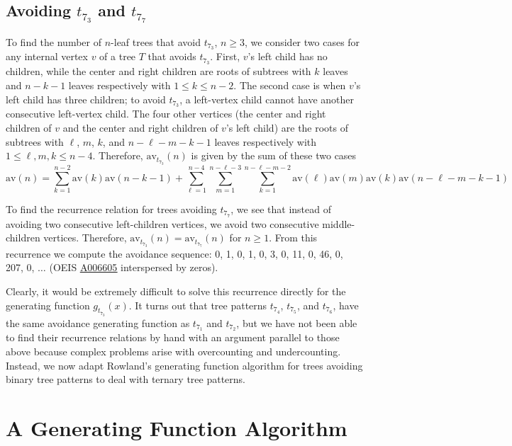 \documentclass[12pt]{article}
\newcommand{\seqnum}[1]{\href{http://oeis.org/#1}{\underline{#1}}}
\begin{document}
\subsection{Avoiding \texorpdfstring{$t_{7_3}$}{t73} and \texorpdfstring{$t_{7_7}$}{t77}}

To find the number of $n$-leaf trees that avoid $t_{7_3}$, $n\geq3$, we consider two cases for any internal vertex $v$ of a tree $T$ that avoids $t_{7_3}$. First, $v$'s left child has no children, while the center and right children are roots of subtrees with $k$ leaves and $n-k-1$ leaves respectively with $1 \leq k \leq n-2$. The second case is when $v$'s left child has three children; to avoid $t_{7_3}$, a left-vertex child cannot have another consecutive left-vertex child. The four other vertices (the center and right children of $v$ and the center and right children of $v$'s left child) are the roots of subtrees with $\ell$, $m$, $k$, and $n-\ell-m-k-1$ leaves respectively with $1 \leq \ell,m,k \leq n-4$. Therefore, $\text{av}_{t_{7_3}}(n)$ is given by the sum of these two cases
$$\text{av}(n)= \sum_{k=1}^{n-2} \text{av}(k) \text{av}(n-k-1) + \sum_{\ell=1}^{n-4} \sum_{m=1}^{n-\ell-3} \sum_{k=1}^{n-\ell-m-2} \text{av}(\ell) \text{av}(m) \text{av}(k) \text{av}(n-\ell-m-k-1)$$

To find the recurrence relation for trees avoiding $t_{7_7}$, we see that instead of avoiding two consecutive left-children vertices, we avoid two consecutive middle-children vertices. Therefore, $\text{av}_{t_{7_3}}(n)=\text{av}_{t_{7_7}}(n)$ for $n \geq 1$.  From this recurrence we compute the avoidance sequence: 0, 1, 0, 1, 0, 3, 0, 11, 0, 46, 0, 207, 0, $\dots$ (OEIS \seqnum{A006605} interspersed by zeros).

Clearly, it would be extremely difficult to solve this recurrence directly for the generating function $g_{t_{7_3}}(x)$.  It turns out that tree patterns $t_{7_4}$, $t_{7_5}$, and $t_{7_6}$, have the same avoidance generating function as $t_{7_1}$ and $t_{7_2}$, but we have not been able to find their recurrence relations by hand with an argument parallel to those above because complex problems arise with overcounting and undercounting. Instead, we now adapt Rowland's generating function algorithm for trees avoiding binary tree patterns to deal with ternary tree patterns.

\section{A Generating Function Algorithm}\label{S:gfAlgorithm}
\end{document}
